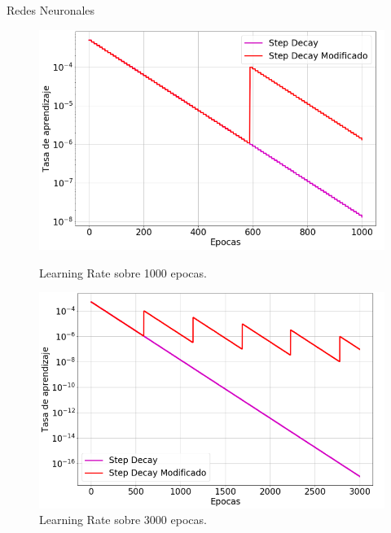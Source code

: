 \documentclass{beamer}
\begin{document}
\begin{frame}{Redes Neuronales}

    \begin{figure}[!tbp]
      \centering
      \begin{minipage}[b]{0.45\textwidth}
        \includegraphics[width=\textwidth]{lr_1000.png}
        \caption{Learning Rate sobre 1000 epocas.}
      \end{minipage}
      \hfill
      \begin{minipage}[b]{0.45\textwidth}
        \includegraphics[width=\textwidth]{lr_3000.png}
        \caption{Learning Rate sobre 3000 epocas.}
      \end{minipage}
    \end{figure}

\end{frame}
\end{document}
